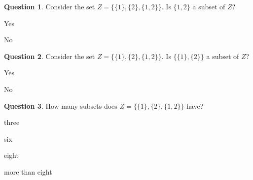 \documentclass[12pt]{amsart}
\theoremstyle{definition}
\newtheorem{question}{Question}
\begin{document}
\begin{question}
Consider the set $Z = \{ \{1\}, \{2\}, \{1, 2\} \}$. Is $\{1, 2\}$ a subset of $Z$?
\begin{compactitem}
\item Yes
\item No
\end{compactitem}
\end{question}

\begin{question}
Consider the set $Z = \{ \{1\}, \{2\}, \{1, 2\} \}$. Is $\{ \{1\}, \{2\}\}$ a subset of $Z$?
\begin{compactitem}
\item Yes
\item No
\end{compactitem}
\end{question}

\begin{question}
How many subsets does $Z = \{ \{1\}, \{2\}, \{1, 2\} \}$ have?
\begin{compactitem}
\item three
\item six
\item eight
\item more than eight
\end{compactitem}
\end{question}
\end{document}
